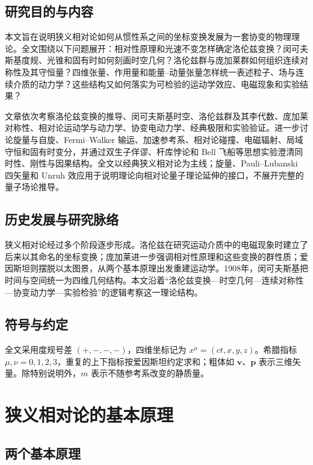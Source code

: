 \documentclass[style=classic,color=full]{lc-article}
\begin{document}
\subsection{研究目的与内容}

本文旨在说明狭义相对论如何从惯性系之间的坐标变换发展为一套协变的物理理论。全文围绕以下问题展开：相对性原理和光速不变怎样确定洛伦兹变换？闵可夫斯基度规、光锥和固有时如何刻画时空几何？洛伦兹群与庞加莱群如何组织连续对称性及其守恒量？四维张量、作用量和能量--动量张量怎样统一表述粒子、场与连续介质的动力学？这些结构又如何落实为可检验的运动学效应、电磁现象和实验结果？

文章依次考察洛伦兹变换的推导、闵可夫斯基时空、洛伦兹群及其李代数、庞加莱对称性、相对论运动学与动力学、协变电动力学、经典极限和实验验证。进一步讨论旋量与自旋、Fermi--Walker 输运、加速参考系、相对论碰撞、电磁辐射、局域守恒和固有时变分，并通过双生子佯谬、杆库悖论和 Bell 飞船等思想实验澄清同时性、刚性与因果结构。全文以经典狭义相对论为主线；旋量、Pauli--Lubanski 四矢量和 Unruh 效应用于说明理论向相对论量子理论延伸的接口，不展开完整的量子场论推导。

\subsection{历史发展与研究脉络}

狭义相对论经过多个阶段逐步形成。洛伦兹在研究运动介质中的电磁现象时建立了后来以其命名的坐标变换；庞加莱进一步强调相对性原理和这些变换的群性质；爱因斯坦则摆脱以太图景，从两个基本原理出发重建运动学。1908年，闵可夫斯基把时间与空间统一为四维几何结构\cite{minkowski1909}。本文沿着“洛伦兹变换—时空几何—连续对称性—协变动力学—实验检验”的逻辑考察这一理论结构。

\subsection{符号与约定}

全文采用度规号差 $(+,-,-,-)$，四维坐标记为 $x^\mu=(ct,x,y,z)$。希腊指标 $\mu,\nu=0,1,2,3$，重复的上下指标按爱因斯坦约定求和；粗体如 $\bm v$、$\bm p$ 表示三维矢量。除特别说明外，$m$ 表示不随参考系改变的静质量。

\section{狭义相对论的基本原理}

\subsection{两个基本原理}
\end{document}
